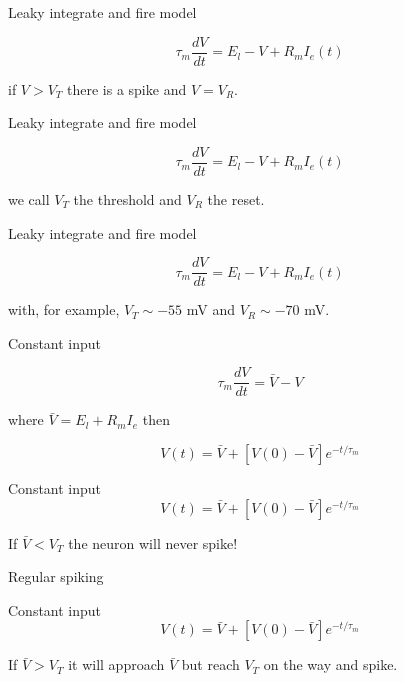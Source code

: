\documentclass{beamer}
\newcommand{\crish}{\color{reddish}}
\newcommand{\cbla}{\color{black}}
\newcommand{\cblu}{\color{blue}}
\begin{document}
\begin{frame}{Leaky integrate and fire model}

  \crish
  $$\tau_m\frac{dV}{dt}=E_l-V+R_mI_e(t)$$
  \cbla

  if \crish{}$V>V_T$\cbla{} there is a \cblu{}spike\cbla{} and \crish{}$V=V_R$\cbla{}.
  
\end{frame}


\begin{frame}{Leaky integrate and fire model}

  \crish
  $$\tau_m\frac{dV}{dt}=E_l-V+R_mI_e(t)$$
  \cbla

  we call \crish{}$V_T $\cbla{} the \cblu{}threshold\cbla{} and
  \crish{}$V_R$\cbla{} the \cblu{} reset\cbla{}.
  
\end{frame}


\begin{frame}{Leaky integrate and fire model}

  \crish
  $$\tau_m\frac{dV}{dt}=E_l-V+R_mI_e(t)$$
  \cbla

  with, for example, \crish{}$V_T\sim-55 $ mV\cbla{} and \crish{}$V_R\sim-70$ mV\cbla.
  
\end{frame}

\begin{frame}{Constant input}

  \crish
  $$\tau_m\frac{dV}{dt}=\bar{V}-V$$
  \cbla{}

  where \crish{}$\bar{V}=E_l+R_mI_e$\cbla{} then\crish{}

  $$V(t)=\bar{V}+[V(0)-\bar{V}]e^{-t/\tau_m}$$
\cbla{}
\end{frame}

\begin{frame}{Constant input}
\crish{}
  $$V(t)=\bar{V}+[V(0)-\bar{V}]e^{-t/\tau_m}$$
\cbla{}

If \crish{}$\bar{V}<V_T$\cbla{} the neuron will never spike!
  
\end{frame}


\begin{frame}{Regular spiking}
  \begin{center}
    
\end{center}
  \end{frame}



\begin{frame}{Constant input}
\crish{}
  $$V(t)=\bar{V}+[V(0)-\bar{V}]e^{-t/\tau_m}$$
\cbla{}

If \crish{}$\bar{V}>V_T$\cbla{} it will approach \crish{}$\bar{V}$\cbla{} but reach \crish{}$V_T$\cbla{} on the way and spike.
  
\end{frame}
\end{document}
